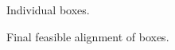 \documentclass[a4paper, 11pt, twoside, onecolumn, openany]{article}
\begin{document}
\begin{figure}[htb]
	\centering
	
	\caption{Individual boxes.}	
\end{figure}



\begin{figure}[htb]
	\centering
	
	\caption{Final feasible alignment of boxes.}	
\end{figure}


\begin{comment}
\begin{table}[htb]
\centering
\begin{tabular}{c|c|c|c|c|}
\cline{2-5}
& \multicolumn{4}{|c|}{Scores} \\ \hline
\multicolumn{1}{|c|}{cycle 1} & 1 & 18 & 2 & 17 \\ \hline
\multicolumn{1}{|c|}{cycle 2} & 4 & 15 & 5 & 14 \\ \hline
\multicolumn{1}{|c|}{cycle 3} & 6 & 13 & 8 & 12 \\
\hline
\end{tabular}
\caption{T-Matrix.}
\end{table}	
\end{comment}



\begin{comment}
\begin{table}[htb]
\centering
\begin{tabular}{c|c|c|}
\cline{2-3}
& \multicolumn{2}{|c|}{Edges} \\ \hline
\multicolumn{1}{|c|}{cycle 1} & 1 & 2 \\ \hline
\multicolumn{1}{|c|}{cycle 2} & 4 & 5 \\ \hline
\multicolumn{1}{|c|}{cycle 3} & 6 & 8 \\
\hline
\end{tabular}
\caption{T-Matrix.}
\end{table}	
\end{comment}
\end{document}
